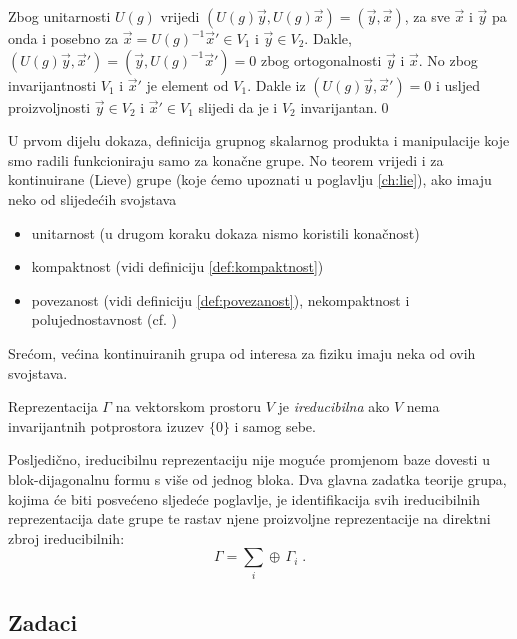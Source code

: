 Zbog unitarnosti $U(g)$ vrijedi $(U(g) \vec{y} , U(g)\vec{x}) = 
(\vec{y}, \vec{x})$,
za sve $\vec{x}$ i $\vec{y}$ pa onda i posebno za 
$\vec{x}=U(g)^{-1}\vec{x}'\in V_1$ i
$\vec{y} \in V_2$. Dakle, $(U(g)\vec{y}, \vec{x}')=(\vec{y}, U(g)^{-1}\vec{x}')
=0$ zbog ortogonalnosti $\vec{y}$ i $\vec{x}$.
No zbog invarijantnosti $V_1$ i $\vec{x}'$ je element od $V_1$. Dakle iz
$(U(g) \vec{y} , \vec{x}') = 0$ i usljed proizvoljnosti $\vec{y}\in V_2$
i $\vec{x}'\in V_1$ slijedi da je i $V_2$ invarijantan.\qed


U prvom dijelu dokaza, definicija grupnog skalarnog produkta i manipulacije
koje smo radili funkcioniraju samo za konačne grupe. No teorem vrijedi i 
za kontinuirane (Lieve) grupe (koje ćemo upoznati u poglavlju \ref{ch:lie}),
ako imaju neko od slijedećih svojstava
\begin{itemize}
\item unitarnost (u drugom koraku dokaza nismo koristili konačnost)
\item kompaktnost (vidi definiciju \ref{def:kompaktnost})
\item povezanost (vidi definiciju \ref{def:povezanost}), nekompaktnost i polujednostavnost (cf. \cite[79]{Cornwell:1997})
\end{itemize}
Srećom, većina kontinuiranih grupa od interesa za fiziku imaju neka od ovih svojstava.


\begin{definicija}
Reprezentacija $\Gamma$ na vektorskom prostoru $V$ je
\emph{ireducibilna} ako $V$ nema invarijantnih potprostora
izuzev $\{0\}$ i samog sebe.
\label{def:irrep}
\end{definicija}
Posljedično, ireducibilnu reprezentaciju nije moguće promjenom baze 
dovesti u blok-dijagonalnu formu s više od jednog bloka.
Dva glavna zadatka teorije grupa, kojima će biti posvećeno sljedeće poglavlje,
je identifikacija svih ireducibilnih reprezentacija date grupe te rastav
njene proizvoljne reprezentacije na direktni zbroj ireducibilnih:
\begin{displaymath}
  \Gamma = \sum_{i} \oplus\, \Gamma_{i} \;.
\end{displaymath}



\subsection*{Zadaci}

